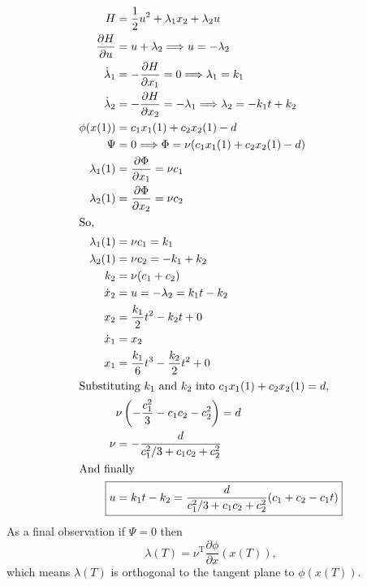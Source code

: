 \documentclass[letterpaper,12pt,titlepage]{report}
\newcommand{\trans}{^\text{T}}
\newcommand*\pder[2]{\frac{\partial #1}{\partial #2}}
\theoremstyle{plain}
\theoremstyle{definition}
\begin{document}
\begin{align}
  H &= \frac12 u^2 + \lambda_1 x_2 + \lambda_2 u \\
  \pder{H}{u} &= u + \lambda_2 \Longrightarrow u = -\lambda_2 \\
  \dot\lambda_1 &= -\pder{H}{x_1} = 0 \Longrightarrow \lambda_1 = k_1 \\
  \dot\lambda_2 &= -\pder{H}{x_2} = -\lambda_1 \Longrightarrow \lambda_2 = -k_1 t + k_2 \\
  \phi(x(1)) &= c_1 x_1(1) + c_2 x_2(1) - d \\
  \Psi &= 0 \Longrightarrow \Phi = \nu (c_1x_1(1) + c_2x_2(1) - d) \\
  \lambda_1(1) &= \pder{\Phi}{x_1} = \nu c_1 \\
  \lambda_2(1) &= \pder{\Phi}{x_2} = \nu c_2 \\
  \shortintertext{So,}
  \lambda_1(1) &= \nu c_1 = k_1 \\
  \lambda_2(1) &= \nu c_2 = -k_1 + k_2 \\
  k_2 &= \nu (c_1 + c_2) \\
  \dot x_2 &= u = -\lambda_2 = k_1 t - k_2 \\
  x_2 &= \frac{k_1}{2} t^2 - k_2 t + 0 \\
  \dot x_1 &= x_2 \\
  x_1 &= \frac{k_1}{6} t^3 - \frac{k_2}{2} t^2 + 0 \\
  \shortintertext{Substituting $k_1$ and $k_2$ into $c_1x_1(1)+c_2x_2(1)=d$,}
    & \nu \left( -\frac{c_1^2}{3} - c_1 c_2 - c_2^2 \right) = d \\
  \nu &= - \frac{d}{c_1^2/3 + c_1c_2 + c_2^2} \\
  \shortintertext{And finally}
  \Aboxed{u &= k_1 t - k_2 = \frac{d}{c_1^2/3 + c_1c_2 + c_2^2} (c_1 + c_2 - c_1 t)}
\end{align}
As a final observation if $\Psi=0$ then
\[
  \lambda(T) = \nu\trans \pder{\phi}{x}(x(T)),
\]
which means $\lambda(T)$ is orthogonal to the tangent plane to $\phi(x(T))$.

\begin{center}
\end{center}
\end{document}

